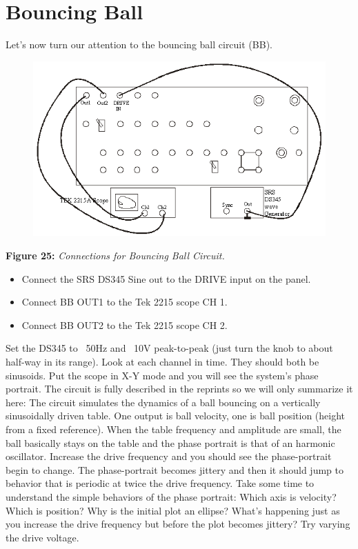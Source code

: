 \documentclass{../lab}
\begin{document}
\section{Bouncing Ball}

Let's now turn our attention to the bouncing ball circuit (BB).


\begin{figure}[h]
    \centering
    \href{http://experimentationlab.berkeley.edu/sites/default/files/images/Nldimage130.png}{\includegraphics[width=0.5\linewidth]{images/Nldimage130.png}}
    \caption{}
    \label{fig:Nldimage130}
\end{figure}

\textbf{Figure 25:} \emph{Connections for Bouncing Ball Circuit.}\begin{itemize}
    \item Connect the SRS DS345 Sine out to the DRIVE input on the panel.

    \item Connect BB OUT1 to the Tek 2215 scope CH 1.

    \item Connect BB OUT2 to the Tek 2215 scope CH 2.

\end{itemize}

Set the DS345 to ~50Hz and ~10V peak-to-peak (just turn the knob to about half-way in its range). Look at each channel in time. They should both be sinusoids. Put the scope in X-Y mode and you will see the system's phase portrait. The circuit is fully described in the reprints so we will only summarize it here: The circuit simulates the dynamics of a ball bouncing on a vertically sinusoidally driven table. One output is ball velocity, one is ball position (height from a fixed reference). When the table frequency and amplitude are small, the ball basically stays on the table and the phase portrait is that of an harmonic oscillator. Increase the drive frequency and you should see the phase-portrait begin to change. The phase-portrait becomes jittery and then it should jump to behavior that is periodic at twice the drive frequency. Take some time to understand the simple behaviors of the phase portrait: Which axis is velocity? Which is position? Why is the initial plot an ellipse? What's happening just as you increase the drive frequency but before the plot becomes jittery? Try varying the drive voltage.
\end{document}

